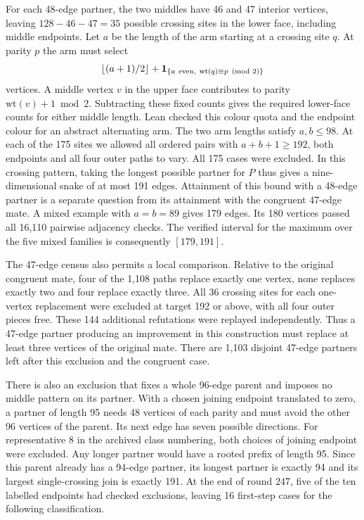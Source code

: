 \documentclass[11pt,a4paper]{article}
\theoremstyle{definition}
\theoremstyle{remark}
\begin{document}
For each 48-edge partner, the two middles have 46 and 47 interior
vertices, leaving \(128-46-47=35\) possible crossing sites in the lower
face, including middle endpoints. Let \(a\) be the length of the arm
starting at a crossing site \(q\). At parity \(p\) the arm must select
\[
 \left\lfloor (a+1)/2\right\rfloor+
 \mathbf 1_{\{a\ {\rm even},\ \mathrm{wt}(q)\equiv p\pmod 2\}}
\]
vertices. A middle vertex \(v\) in the upper face contributes to parity
\(\mathrm{wt}(v)+1\bmod 2\). Subtracting these fixed counts gives the
required lower-face counts for either middle length. Lean checked this
colour quota and the endpoint colour for an abstract alternating arm.
The two arm lengths
satisfy \(a,b\le98\). At each of the 175 sites we allowed all ordered
pairs with \(a+b+1\ge192\), both endpoints and all four outer paths to
vary. All 175 cases were excluded. In this crossing pattern, taking the
longest possible partner for \(P\) thus gives a nine-dimensional snake of
at most 191 edges. Attainment of this bound with a 48-edge partner is a
separate question from its attainment with the congruent 47-edge mate.
A mixed example with \(a=b=89\) gives 179 edges. Its 180 vertices
passed all 16,110 pairwise adjacency checks. The verified interval for
the maximum over the five mixed families is consequently \([179,191]\).

The 47-edge census also permits a local comparison. Relative to the
original congruent mate, four of the 1,108 paths replace exactly one
vertex, none replaces exactly two and four replace exactly three.
All 36 crossing sites for each one-vertex replacement were excluded
at target 192 or above, with all four outer pieces free. These 144
additional refutations were replayed independently. Thus a 47-edge
partner producing an improvement in this construction must replace at
least three vertices of the original mate. There are 1,103 disjoint
47-edge partners left after this exclusion and the congruent case.

There is also an exclusion that fixes a whole 96-edge parent and imposes
no middle pattern on its partner. With a chosen joining endpoint
translated to zero, a partner of length 95 needs 48 vertices of each
parity and must avoid the other 96 vertices of the parent. Its next edge
has seven possible directions. For representative 8 in the archived
class numbering, both choices of joining endpoint were excluded. Any
longer partner would have a rooted prefix of length 95. Since this parent
already has a 94-edge partner, its longest partner is exactly 94 and its
largest single-crossing join is exactly 191. At the end of round 247,
five of the ten labelled endpoints had checked exclusions, leaving
16 first-step cases for the following classification.
\end{document}
